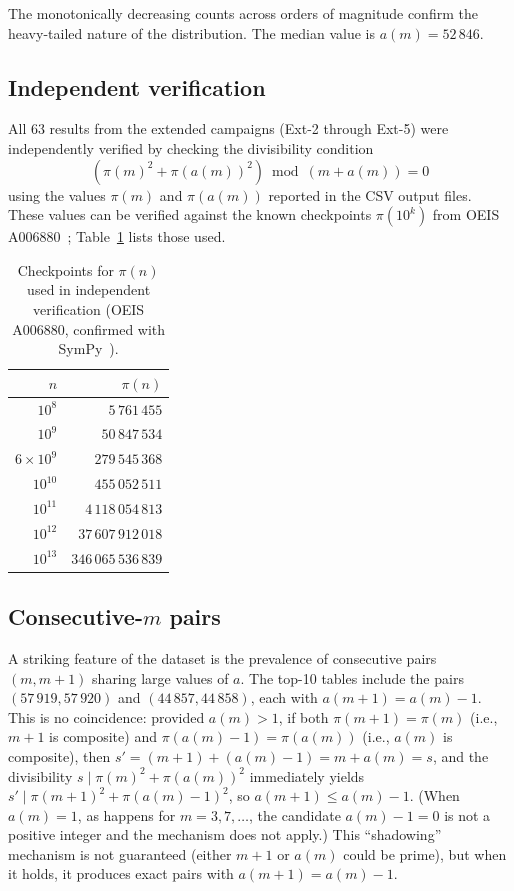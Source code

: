 \documentclass{amsart}
\theoremstyle{definition}
\theoremstyle{remark}
\numberwithin{equation}{section}
\begin{document}
The monotonically decreasing counts across orders of magnitude
confirm the heavy-tailed nature of the distribution.
The median value is $a(m) = 52\,846$.

\subsection{Independent verification}

All $63$ results from the extended campaigns (Ext-2 through Ext-5)
were independently verified by checking the divisibility condition
\begin{equation}\label{eq:verify}
(\pi(m)^2 + \pi(a(m))^2) \bmod (m + a(m)) = 0
\end{equation}
using the values $\pi(m)$ and $\pi(a(m))$ reported in the CSV
output files.  These values can be verified against the known
checkpoints $\pi(10^k)$ from OEIS A006880~\cite{OEIS_A006880};
Table~\ref{tab:pi_checkpoints} lists those used.

\begin{table}[ht]
\centering
\caption{Checkpoints for $\pi(n)$ used in independent verification
(OEIS A006880, confirmed with SymPy~\cite{SymPy}).}
\label{tab:pi_checkpoints}
\begin{tabular}{rr}
\toprule
$n$ & $\pi(n)$ \\
\midrule
$10^{8}$ & $5\,761\,455$ \\
$10^{9}$ & $50\,847\,534$ \\
$6 \times 10^{9}$ & $279\,545\,368$ \\
$10^{10}$ & $455\,052\,511$ \\
$10^{11}$ & $4\,118\,054\,813$ \\
$10^{12}$ & $37\,607\,912\,018$ \\
$10^{13}$ & $346\,065\,536\,839$ \\
\bottomrule
\end{tabular}
\end{table}

\subsection{Consecutive-$m$ pairs}

A striking feature of the dataset is the prevalence of consecutive
pairs $(m, m+1)$ sharing large values of $a$.  The top-10 tables
include the pairs $(57\,919, 57\,920)$ and $(44\,857, 44\,858)$,
each with $a(m+1) = a(m) - 1$.  This is no coincidence: provided
$a(m) > 1$, if both $\pi(m+1) = \pi(m)$ (i.e., $m+1$ is composite)
and $\pi(a(m)-1) = \pi(a(m))$ (i.e., $a(m)$ is composite), then
$s' = (m+1) + (a(m)-1) = m + a(m) = s$, and the divisibility
$s \mid \pi(m)^2 + \pi(a(m))^2$ immediately yields
$s' \mid \pi(m+1)^2 + \pi(a(m)-1)^2$, so
$a(m+1) \le a(m) - 1$.
(When $a(m) = 1$, as happens for $m = 3, 7, \ldots$, the candidate
$a(m) - 1 = 0$ is not a positive integer and the mechanism does
not apply.)
This ``shadowing'' mechanism is not guaranteed (either $m+1$ or
$a(m)$ could be prime), but when it holds, it produces
exact pairs with $a(m+1) = a(m) - 1$.
\end{document}
